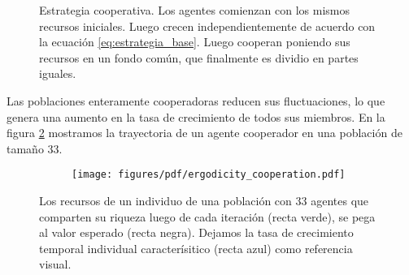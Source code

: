 \documentclass[a4paper,10pt]{article}
\begin{document}
\begin{figure}[H]
\centering
{}
\caption{Estrategia cooperativa. Los agentes comienzan con los mismos recursos iniciales. Luego crecen independientemente de acuerdo con la ecuaci\'on \ref{eq:estrategia_base}. Luego cooperan poniendo sus recursos en un fondo común, que finalmente es dividio en partes iguales.}
\label{fig:protocolo}
\end{figure}

Las poblaciones enteramente cooperadoras reducen sus fluctuaciones, lo que genera una aumento en la tasa de crecimiento de todos sus miembros.
En la figura \ref{fig:ergodicity_cooperation} mostramos la trayectoria de un agente cooperador en una población de tamaño 33.
\begin{figure}[H]
    \centering
    \begin{subfigure}[b]{0.45\textwidth}
    \texttt{[image: figures/pdf/ergodicity\_cooperation.pdf]}
    \end{subfigure}
    \caption{
    Los recursos de un individuo de una población con 33 agentes que comparten su riqueza luego de cada iteración (recta verde), se pega al valor esperado (recta negra).
    Dejamos la tasa de crecimiento temporal individual caracterísitico (recta azul) como referencia visual.
    }
    \label{fig:ergodicity_cooperation}
\end{figure}
%
\end{document}

